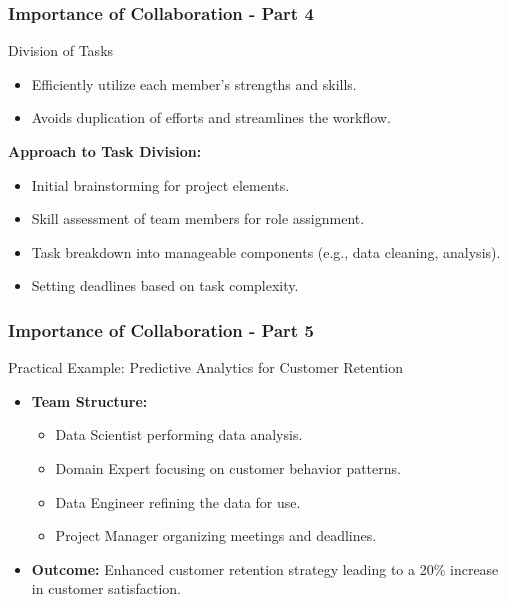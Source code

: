 \documentclass[aspectratio=169]{beamer}
\begin{document}
\begin{frame}[fragile]
    \frametitle{Importance of Collaboration - Part 4}
    \begin{block}{Division of Tasks}
        \begin{itemize}
            \item Efficiently utilize each member's strengths and skills.
            \item Avoids duplication of efforts and streamlines the workflow.
        \end{itemize}
        \textbf{Approach to Task Division:}
        \begin{itemize}
            \item Initial brainstorming for project elements.
            \item Skill assessment of team members for role assignment.
            \item Task breakdown into manageable components (e.g., data cleaning, analysis).
            \item Setting deadlines based on task complexity.
        \end{itemize}
    \end{block}
\end{frame}

\begin{frame}[fragile]
    \frametitle{Importance of Collaboration - Part 5}
    \begin{block}{Practical Example: Predictive Analytics for Customer Retention}
        \begin{itemize}
            \item \textbf{Team Structure:}
                \begin{itemize}
                    \item Data Scientist performing data analysis.
                    \item Domain Expert focusing on customer behavior patterns.
                    \item Data Engineer refining the data for use.
                    \item Project Manager organizing meetings and deadlines.
                \end{itemize}
            \item \textbf{Outcome:} Enhanced customer retention strategy leading to a 20\% increase in customer satisfaction.
        \end{itemize}
    \end{block}
\end{frame}
\end{document}
